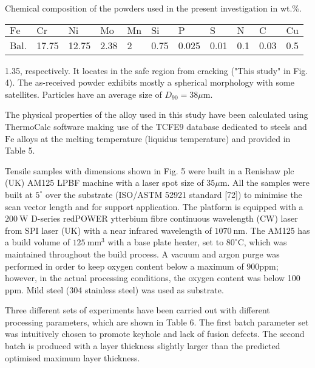 \documentclass[10pt]{article}
\begin{document}
Chemical composition of the powders used in the present investigation in wt.\%.

\begin{center}
\begin{tabular}{lllllllllll}
\hline
$\mathrm{Fe}$ & $\mathrm{Cr}$ & $\mathrm{Ni}$ & $\mathrm{Mo}$ & $\mathrm{Mn}$ & $\mathrm{Si}$ & $\mathrm{P}$ & $\mathrm{S}$ & $\mathrm{N}$ & $\mathrm{C}$ & $\mathrm{Cu}$ \\
\hline
Bal. & 17.75 & 12.75 & 2.38 & 2 & 0.75 & 0.025 & 0.01 & 0.1 & 0.03 & 0.5 \\
\hline
\end{tabular}
\end{center}

1.35, respectively. It locates in the safe region from cracking ("This study" in Fig. 4). The as-received powder exhibits mostly a spherical morphology with some satellites. Particles have an average size of $D_{90}=38 \mu \mathrm{m}$.

The physical properties of the alloy used in this study have been calculated using ThermoCalc software making use of the TCFE9 database dedicated to steels and $\mathrm{Fe}$ alloys at the melting temperature (liquidus temperature) and provided in Table 5.

Tensile samples with dimensions shown in Fig. 5 were built in a Renishaw plc (UK) AM125 LPBF machine with a laser spot size of $35 \mu \mathrm{m}$. All the samples were built at $5^{\circ}$ over the substrate (ISO/ASTM 52921 standard [72]) to minimise the scan vector length and for support application. The platform is equipped with a $200 \mathrm{~W}$ D-series redPOWER ytterbium fibre continuous wavelength (CW) laser from SPI laser (UK) with a near infrared wavelength of $1070 \mathrm{~nm}$. The AM125 has a build volume of $125 \mathrm{~mm}^{3}$ with a base plate heater, set to $80^{\circ} \mathrm{C}$, which was maintained throughout the build process. A vacuum and argon purge was performed in order to keep oxygen content below a maximum of $900 \mathrm{ppm}$; however, in the actual processing conditions, the oxygen content was below 100 ppm. Mild steel (304 stainless steel) was used as substrate.

Three different sets of experiments have been carried out with different processing parameters, which are shown in Table 6. The first batch parameter set was intuitively chosen to promote keyhole and lack of fusion defects. The second batch is produced with a layer thickness slightly larger than the predicted optimised maximum layer thickness.
\end{document}
